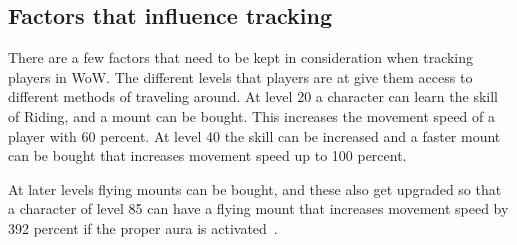 %
%
%


\subsection{Factors that influence tracking} 

There are a few factors that need to be kept in consideration when tracking players in WoW. The different levels that players are at give them access to different methods of traveling around. At level 20 a character can learn the skill of Riding, and a mount can be bought. This increases the movement speed of a player with 60 percent. At level 40 the skill can be increased and a faster mount can be bought that increases movement speed up to 100 percent. 

At later levels flying mounts can be bought, and these also get upgraded so that a character of level 85 can have a flying mount that increases movement speed by 392 percent if the proper aura is activated~\cite{mount}.

